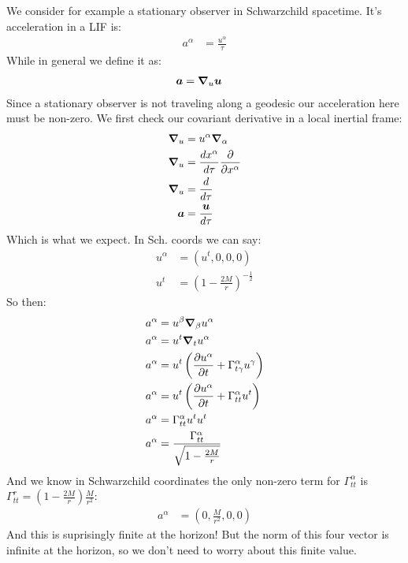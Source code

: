We consider for example a stationary observer in Schwarzchild spacetime. It's acceleration in a LIF is:
\begin{align*}
	a^\alpha &= \frac{u^\alpha}{\tau}
\end{align*}
While in general we define it as:
\begin{align*}
	\bm{a} &= \bm{\nabla}_u\bm{u}
\end{align*}
Since a stationary observer is not traveling along a geodesic our acceleration here must be non-zero.
We first check our covariant derivative in a local inertial frame:
\begin{align*}
	\bm{\nabla}_u &= u^\alpha \bm{\nabla}_\alpha \\
	\bm{\nabla}_u &= \frac{dx^\alpha}{d\tau} \frac{\partial }{\partial x^\alpha} \\
	\bm{\nabla}_u &= \frac{d}{d\tau} \\
	\bm{a} &= \frac{\bm{u}}{d\tau}
\end{align*}
Which is what we expect. In Sch. coords we can say:
\begin{align*}
	u^\alpha &= (u^t,0,0,0) \\
	u^t &= \left(1 - \frac{2M}{r}\right)^{-\frac{1}{2}}
\end{align*}
So then:
\begin{align*}
	a^\alpha &= u^\beta \bm{\nabla}_\beta u^\alpha \\
	a^\alpha &= u^t \bm{\nabla}_t u^\alpha \\
	a^\alpha &= u^t \left(\frac{\partial u^\alpha}{\partial t} + \Gamma^\alpha_{t\gamma} u^\gamma\right) \\
	a^\alpha &= u^t \left(\frac{\partial u^\alpha}{\partial t} + \Gamma^\alpha_{tt} u^t\right) \\
	a^\alpha &= \Gamma^\alpha_{tt} u^tu^t \\ 
	a^\alpha &= \frac{\Gamma^\alpha_{tt}}{\sqrt{1-\frac{2M}{r}}}
\end{align*}
And we know in Schwarzchild coordinates the only non-zero term for $\Gamma^\alpha_{tt}$ is $\Gamma^r_{tt}= \left(1-\frac{2M}{r}\right)\frac{M}{r^2}$:
\begin{align*}
	a^\alpha &= (0,\frac{M}{r^2},0,0)
\end{align*}
And this is suprisingly finite at the horizon! But the norm of this four vector is infinite at the horizon, so we don't need to worry about this finite value.

